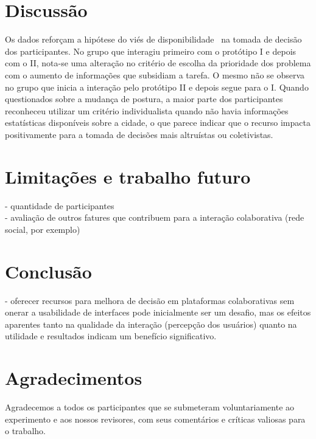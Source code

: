 \documentclass{sigchi}
\begin{document}
\section{Discussão}
Os dados reforçam a hipótese do viés de disponibilidade~\cite{tversky:1973} na tomada de decisão dos participantes. No grupo que interagiu primeiro com o protótipo I e depois com o II, nota-se uma alteração no critério de escolha da prioridade dos problema com o aumento de informações que subsidiam a tarefa. O mesmo não se observa no grupo que inicia a interação pelo protótipo II e depois segue para o I. Quando questionados sobre a mudança de postura, a maior parte dos participantes reconheceu utilizar um critério individualista quando não havia informações estatísticas disponíveis sobre a cidade, o que parece indicar que o recurso impacta positivamente para a tomada de decisões mais altruístas ou coletivistas.

\section{Limitações e trabalho futuro}
- quantidade de participantes\\
- avaliação de outros fatures que contribuem para a interação colaborativa (rede social, por exemplo)

\section{Conclusão}
- oferecer recursos para melhora de decisão em plataformas colaborativas sem onerar a usabilidade de interfaces pode inicialmente ser um desafio, mas os efeitos aparentes tanto na qualidade da interação (percepção dos usuários) quanto na utilidade e resultados indicam um benefício significativo.


\section{Agradecimentos}

Agradecemos a todos os participantes que se submeteram voluntariamente ao experimento e aos nossos revisores, com seus comentários e críticas valiosas para o trabalho.


\balance{}


\balance{}



\end{document}
